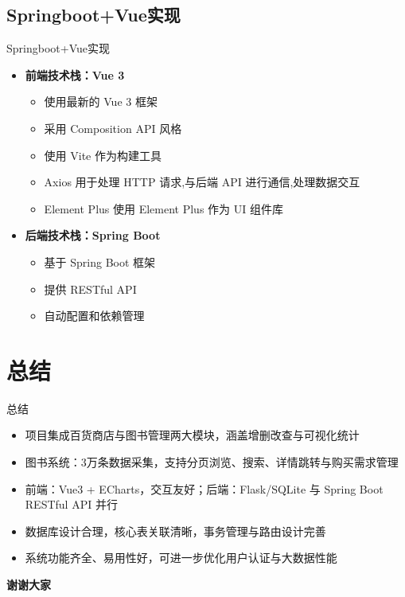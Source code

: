 \documentclass{ctexbeamer}
\begin{document}
\subsection{Springboot+Vue实现}
\begin{frame}{Springboot+Vue实现}
\begin{itemize}
    \item \textbf{前端技术栈：Vue 3}
    \begin{itemize}
        \item 使用最新的 Vue 3 框架
        \item 采用 Composition API 风格
        \item  使用 Vite 作为构建工具
        \item Axios 用于处理 HTTP 请求,与后端 API 进行通信,处理数据交互
        \item Element Plus 使用 Element Plus 作为 UI 组件库
    \end{itemize}
    \item \textbf{后端技术栈：Spring Boot}
    \begin{itemize}
        \item 基于 Spring Boot 框架
        \item 提供 RESTful API
        \item  自动配置和依赖管理
    \end{itemize}
\end{itemize}
\end{frame}

\section{总结}

\begin{frame}{总结}
  \begin{itemize}
    \item 项目集成百货商店与图书管理两大模块，涵盖增删改查与可视化统计
    \item 图书系统：3万条数据采集，支持分页浏览、搜索、详情跳转与购买需求管理
    \item 前端：Vue3 + ECharts，交互友好；后端：Flask/SQLite 与 Spring Boot RESTful API 并行
    \item 数据库设计合理，核心表关联清晰，事务管理与路由设计完善
    \item 系统功能齐全、易用性好，可进一步优化用户认证与大数据性能
  \end{itemize}
\end{frame}

\begin{frame}
  \begin{center}
    {\Huge \textbf{谢谢大家}}
  \end{center}
\end{frame}
\end{document}
